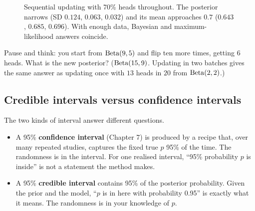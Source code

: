 \begin{figure}[H]
\centering
{}
\caption{Sequential updating with 70\% heads throughout. The posterior narrows (SD
$0.124$, $0.063$, $0.032$) and its mean approaches $0.7$ ($0.643$, $0.685$, $0.696$).
With enough data, Bayesian and maximum-likelihood answers coincide.}
\label{fig:lik-sequential}
\end{figure}

\begin{recoverybox}
Pause and think: you start from $\operatorname{Beta}(9,5)$ and flip ten more times, getting $6$ heads.
What is the new posterior? ($\operatorname{Beta}(15,9)$. Updating in two batches gives the same answer
as updating once with $13$ heads in $20$ from $\operatorname{Beta}(2,2)$.)
\end{recoverybox}

\subsection{Credible intervals versus confidence intervals}

The two kinds of interval answer different questions.

\begin{itemize}
  \item A 95\% \textbf{confidence interval} (Chapter 7) is produced by a recipe that, over
  many repeated studies, captures the fixed true $p$ 95\% of the time. The randomness is
  in the interval. For one realised interval, ``95\% probability $p$ is inside'' is not a
  statement the method makes.
  \item A 95\% \textbf{credible interval} contains 95\% of the posterior probability.
  Given the prior and the model, ``$p$ is in here with probability 0.95'' is exactly
  what it means. The randomness is in your knowledge of $p$.
\end{itemize}

